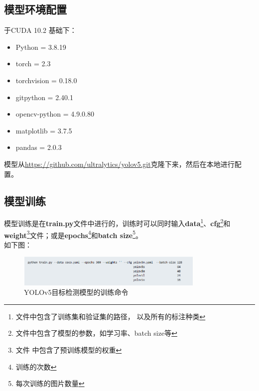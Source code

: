 \documentclass{nwputhesis}
\begin{document}
\subsection{模型环境配置}
\noindent 于CUDA 10.2 基础下：
\begin{itemize}
    \item Python = 3.8.19
    \item torch = 2.3
    \item torchvision = 0.18.0
    \item gitpython = 2.40.1
    \item opencv-python = 4.9.0.80
    \item matplotlib = 3.7.5
    \item pandas = 2.0.3
\end{itemize}
模型从\underline{https://github.com/ultralytics/yolov5.git}克隆下来，然后在本地进行配置。

\subsection{模型训练}
\indent 模型训练是在\textbf{train.py}文件中进行的，训练时可以同时输入\textbf{data}\footnote{文件中包含了训练集和验证集的路径，
以及所有的标注种类}、\textbf{cfg}\footnote{文件中包含了模型的参数，如学习率、batch size等}和\textbf{weight}\footnote{文件
中包含了预训练模型的权重}文件；或是\textbf{epochs}\footnote{训练的次数}和\textbf{batch size}\footnote{每次训练的图片数量}。
\\
如下图：
\begin{figure}[H]
    \centering
    \includegraphics[width=0.8\textwidth]{picture/2.png}
    \caption{YOLOv5目标检测模型的训练命令}
\end{figure}
\end{document}
